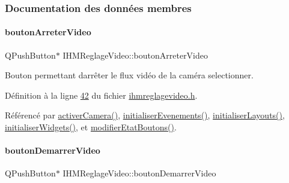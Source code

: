 \subsubsection{Documentation des données membres}
\mbox{\label{class_i_h_m_reglage_video_a705db68dd445a91a4144a3c9bf95a9cf}} 
\paragraph{\texorpdfstring{bouton\+Arreter\+Video}{boutonArreterVideo}}
{\footnotesize\ttfamily Q\+Push\+Button$\ast$ I\+H\+M\+Reglage\+Video\+::bouton\+Arreter\+Video\hspace{0.3cm}{\ttfamily [private]}}



Bouton permettant d\textquotesingle{}arrêter le flux vidéo de la caméra selectionner. 



Définition à la ligne \hyperlink{ihmreglagevideo_8h_source_l00042}{42} du fichier \hyperlink{ihmreglagevideo_8h_source}{ihmreglagevideo.\+h}.



Référencé par \hyperlink{ihmreglagevideo_8cpp_source_l00203}{activer\+Camera()}, \hyperlink{ihmreglagevideo_8cpp_source_l00105}{initialiser\+Evenements()}, \hyperlink{ihmreglagevideo_8cpp_source_l00061}{initialiser\+Layouts()}, \hyperlink{ihmreglagevideo_8cpp_source_l00023}{initialiser\+Widgets()}, et \hyperlink{ihmreglagevideo_8cpp_source_l00212}{modifier\+Etat\+Boutons()}.

\mbox{\label{class_i_h_m_reglage_video_a98d33390551ab92165f192be44f6361d}} 
\paragraph{\texorpdfstring{bouton\+Demarrer\+Video}{boutonDemarrerVideo}}
{\footnotesize\ttfamily Q\+Push\+Button$\ast$ I\+H\+M\+Reglage\+Video\+::bouton\+Demarrer\+Video\hspace{0.3cm}{\ttfamily [private]}}



